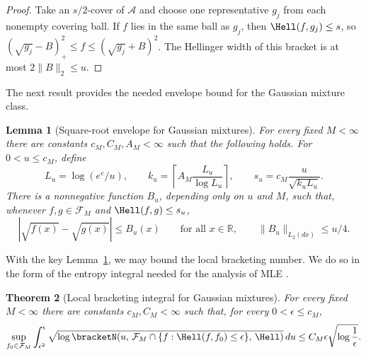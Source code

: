 \documentclass[letterpaper,11pt]{article}
\newcommand{\calF}{{\mathcal{F}}}
\newtheorem{theorem}{Theorem}
\newtheorem{lemma}[theorem]{Lemma}
\theoremstyle{definition}
\begin{document}
\begin{proof}
Take an $s/2$-cover of $\mathcal A$ and choose one representative $g_j$
from each nonempty covering ball.  If $f$ lies in the same ball as $g_j$,
then $\Hell(f,g_j)\le s$, so
$(\sqrt{g_j}-B)_+^2\le f\le(\sqrt{g_j}+B)^2$. 
The Hellinger width of this bracket is at most $2\|B\|_2\le u$.
\end{proof}

The next result provides the needed envelope bound for the Gaussian mixture class.
\begin{lemma}[Square-root envelope for Gaussian mixtures]
\label{lmm:scale-dependent-full-envelope}
For every fixed $M<\infty$ there are constants $c_M,C_M,A_M<\infty$ such
that the following holds.  For $0<u\le c_M$, define
\[
L_u=\log(e^e/u),
\qquad
k_u=\left\lceil A_M\frac{L_u}{\log L_u}\right\rceil,
\qquad
s_u=c_M\frac{u}{\sqrt{k_uL_u}} .
\]
There is a nonnegative function $B_u$, depending only on $u$ and $M$, such
that, whenever $f,g\in\calF_M$ and $\Hell(f,g)\le s_u$,
\[
|\sqrt {f(x)}-\sqrt{ g(x)}|\le B_u(x)
\qquad\text{for all }x\in\mathbb R,
\qquad
\|B_u\|_{L_2(dx)}\le u/4 .
\]
\end{lemma}

With the key Lemma~\ref{lmm:scale-dependent-full-envelope}, we may bound the local bracketing number. We do so in the form of the entropy integral needed for the analysis of MLE \cite{wong.shen.1995}.
\begin{theorem}[Local bracketing integral for Gaussian mixtures]
\label{thm:full-local-bracketing-integral}
For every fixed $M<\infty$ there are constants $c_M,C_M<\infty$ such that,
for every $0<\epsilon\le c_M$,
\[
\sup_{f_0\in\calF_M}
\int_{\epsilon^2}^{\epsilon}
\sqrt{
\log
\bracketN\!\left(
u,\,
\calF_M\cap\{f:\Hell(f,f_0)\le\epsilon\},\,
\Hell
\right)
}\,du
\le
C_M\epsilon\sqrt{\log\frac1\epsilon}.
\]
\end{theorem}
\end{document}
